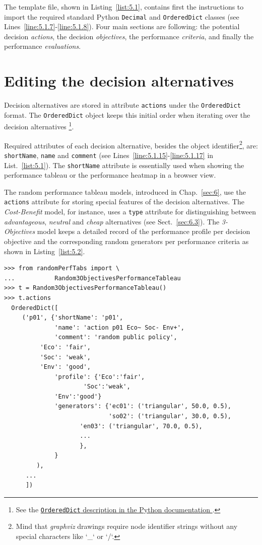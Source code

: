 The template file, shown in Listing~\vref{list:5.1}, contains first the instructions to import the required standard Python \texttt{Decimal} and \texttt{OrderedDict} classes (see Lines~\ref{line:5.1.7}-\ref{line:5.1.8}). Four main sections are following: the potential decision \emph{actions}, the decision \emph{objectives}, the performance \emph{criteria}, and finally the performance \emph{evaluations}.  

\section{Editing the decision alternatives}
\label{sec:5.2}

Decision alternatives are stored in attribute \texttt{actions} under the \texttt{OrderedDict} format. The \texttt{OrderedDict} object keeps this initial order when iterating over the decision alternatives \footnote{See the \href{https://docs.python.org/3/library/collections.html}{\texttt{OrderedDict} description in the Python documentation \citep{python}}.}.

Required attributes of each decision alternative, besides the object identifier\footnote{Mind that \emph{graphviz} drawings require node identifier strings without any special characters like `\_` or `/`.},  are: \texttt{shortName}, \texttt{name} and \texttt{comment} (see Lines~\ref{line:5.1.15}-\ref{line:5.1.17} in List.~\vref{list:5.1}). The \texttt{shortName} attribute is essentially used when showing the performance tableau or the performance heatmap in a browser view.

The random performance tableau models, introduced in Chap.~\ref{sec:6}, use the \texttt{actions} attribute for storing special features of the decision alternatives. The \emph{Cost-Benefit} model, for instance, uses a \texttt{type} attribute for distinguishing between \emph{advantageous}, \emph{neutral} and \emph{cheap} alternatives (see Sect.~\ref{sec:6.3}). The \emph{3-Objectives} model keeps a detailed record of the performance profile per decision objective and the corresponding random generators per performance criteria as shown in Listing~\vref{list:5.2}.
\begin{lstlisting}[caption={Example of decision alternative description},label=list:5.2]
>>> from randomPerfTabs import \
...           Random3ObjectivesPerformanceTableau
>>> t = Random3ObjectivesPerformanceTableau()
>>> t.actions
  OrderedDict([
     ('p01', {'shortName': 'p01',
              'name': 'action p01 Eco~ Soc- Env+',
              'comment': 'random public policy',
	      'Eco': 'fair',
	      'Soc': 'weak',
	      'Env': 'good',
              'profile': {'Eco':'fair',
	                  'Soc':'weak',
			  'Env':'good'}
              'generators': {'ec01': ('triangular', 50.0, 0.5),
                             'so02': ('triangular', 30.0, 0.5),
		             'en03': ('triangular', 70.0, 0.5),
		             ...
		             },
              }
         ),
      ...
      ])
\end{lstlisting}

